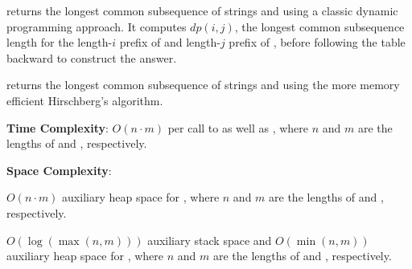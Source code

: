 \begin{compactitem}
  \item {} returns the longest common subsequence of strings  and  using a classic dynamic programming approach. It computes $dp(i, j)$, the longest common subsequence length for the length-$i$ prefix of  and length-$j$ prefix of , before following the table backward to construct the answer.
  \item {} returns the longest common subsequence of strings  and  using the more memory efficient Hirschberg's algorithm.
\end{compactitem}

\textbf{Time Complexity}: $O(n \cdot m)$ per call to  as well as , where $n$ and $m$ are the lengths of  and , respectively.

\textbf{Space Complexity}:
\begin{compactitem}
  \item $O(n \cdot m)$ auxiliary heap space for , where $n$ and $m$ are the lengths of  and , respectively.
  \item $O(\log\left(\max\left(n, m\right)\right))$ auxiliary stack space and $O(\min\left(n, m\right))$ auxiliary heap space for , where $n$ and $m$ are the lengths of  and , respectively.
\end{compactitem}

